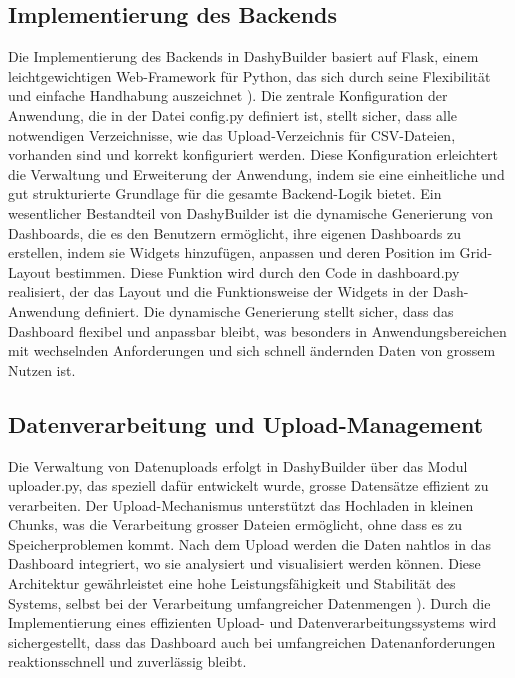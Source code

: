 \documentclass[a4paper, 12pt]{scrartcl}
\begin{document}
\subsection{Implementierung des Backends}
Die Implementierung des Backends in DashyBuilder basiert auf Flask, einem leichtgewichtigen Web-Framework für Python, das sich durch seine Flexibilität und einfache Handhabung auszeichnet \cite[S.119]{Dibia2023}). Die zentrale Konfiguration der Anwendung, die in der Datei config.py definiert ist, stellt sicher, dass alle notwendigen Verzeichnisse, wie das Upload-Verzeichnis für CSV-Dateien, vorhanden sind und korrekt konfiguriert werden. Diese Konfiguration erleichtert die Verwaltung und Erweiterung der Anwendung, indem sie eine einheitliche und gut strukturierte Grundlage für die gesamte Backend-Logik bietet. Ein wesentlicher Bestandteil von DashyBuilder ist die dynamische Generierung von Dashboards, die es den Benutzern ermöglicht, ihre eigenen Dashboards zu erstellen, indem sie Widgets hinzufügen, anpassen und deren Position im Grid-Layout bestimmen. Diese Funktion wird durch den Code in dashboard.py realisiert, der das Layout und die Funktionsweise der Widgets in der Dash-Anwendung definiert. Die dynamische Generierung stellt sicher, dass das Dashboard flexibel und anpassbar bleibt, was besonders in Anwendungsbereichen mit wechselnden Anforderungen und sich schnell ändernden Daten von grossem Nutzen ist.

\subsection{Datenverarbeitung und Upload-Management}
Die Verwaltung von Datenuploads erfolgt in DashyBuilder über das Modul uploader.py, das speziell dafür entwickelt wurde, grosse Datensätze effizient zu verarbeiten. Der Upload-Mechanismus unterstützt das Hochladen in kleinen Chunks, was die Verarbeitung grosser Dateien ermöglicht, ohne dass es zu Speicherproblemen kommt. Nach dem Upload werden die Daten nahtlos in das Dashboard integriert, wo sie analysiert und visualisiert werden können. Diese Architektur gewährleistet eine hohe Leistungsfähigkeit und Stabilität des Systems, selbst bei der Verarbeitung umfangreicher Datenmengen \cite[S.119]{Dibia2023}). Durch die Implementierung eines effizienten Upload- und Datenverarbeitungssystems wird sichergestellt, dass das Dashboard auch bei umfangreichen Datenanforderungen reaktionsschnell und zuverlässig bleibt.
\end{document}
